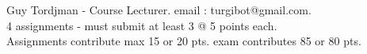 \documentclass[preview]{standalone}
\begin{document}
Guy Tordjman - Course Lecturer.     email : turgibot@gmail.com.\\4 assignments - must submit at least 3 @ 5 points each.\\Assignments contribute max 15 or 20 pts. exam contributes 85 or 80 pts.\\
\end{document}
